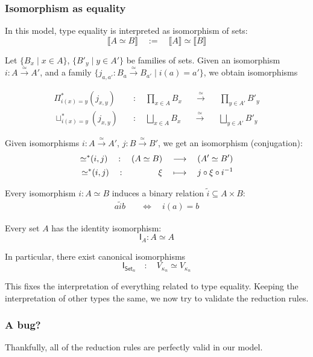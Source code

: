\documentclass[10pt]{article}
\newcommand{\lRa}{\longrightarrow}
\newcommand{\setof}[1]{\{{#1}\}}
\newcommand{\semof}[1]{\llbracket{#1}\rrbracket}
\newcommand{\of}{\quad : \quad}
\newcommand{\rrule}{\hspace{1em}\lRa\hspace{1em}}
\newcommand{\eeq}{\simeq}
\newcommand{\seq}{{\eeq}^*}
\newcommand{\df}{\quad:=\quad}
\newcommand{\bset}{\mathsf{Set}}
\newcommand{\iso}{\stackrel{\eeq}{\to}}
\begin{document}
\subsubsection{Isomorphism as equality}

In this model, type equality is interpreted as isomorphism of sets:
\[ \semof{A \eeq B}  \df \semof{A} \eeq \semof{B} \]

Let $\setof{B_x \mid x \in A}$, $\setof{B'_y \mid y \in A'}$ be
families of sets.
Given an isomorphism $i : A \stackrel{\eeq}{\to} A'$,
and a family $\setof{j_{a,a'} : B_a
  \stackrel{\eeq}{\to} B_{a'} \mid i(a) = a'}$, we obtain isomorphisms

\begin{align*} \Pi^*_{i(x)=y} (j_{x,y}) &\of \prod_{x \in A} B_x
  \ \ \stackrel{\eeq}{\rrule} \ \ \prod_{y \in A'} B'_y\\
\sqcup^*_{i(x)=y}(j_{x,y}) &\of \bigsqcup_{x \in A} B_x
\ \ \stackrel{\eeq}{\rrule}\ \ \bigsqcup_{y \in A'} B'_y
\end{align*}

Given isomorphisms $i : A \iso A'$, $j : B \iso B'$, we get an
isomorphism (conjugation):
\begin{align*}
 \seq(i,j) \of (A \eeq B) &\rrule  (A' \eeq B') \\
 \seq(i,j) \of \hspace{1.06cm}\xi &\quad\longmapsto\quad j \circ \xi \circ i^{-1}
\end{align*}

Every isomorphism $i : A \eeq B$ induces a binary relation
$\tilde i \subseteq A \times B$:
\begin{align*}
a \tilde i b &\quad\iff\quad i(a) = b
\end{align*}

Every set $A$ has the identity isomorphism:
\[ \mathsf{I}_A : A \eeq A \]

In particular, there exist canonical isomorphisms
\[ \mathsf{I}_{\bset_n} \of V_{\kappa_n} \eeq V_{\kappa_n} \]

This fixes the interpretation of everything related to type equality.
Keeping the interpretation of other types the same, we now try to
validate the reduction rules.

\subsubsection{A bug?}

Thankfully, all of the reduction rules are perfectly valid in our model.
\end{document}

